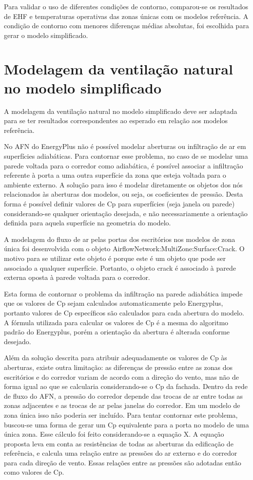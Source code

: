 \documentclass[brazil,hardcopy,openany,a5paper]{ufscthesis}
\begin{document}
	Para validar o uso de diferentes condições de contorno, comparou-se os resultados de EHF e temperaturas operativas das zonas únicas com os modelos referência. A condição de contorno com menores diferenças médias absolutas, foi escolhida para gerar o modelo simplificado.
	
	\section{Modelagem da ventilação natural no modelo simplificado}
	
	A modelagem da ventilação natural no modelo simplificado deve ser adaptada para se ter resultados correspondentes ao esperado em relação aos modelos referência.
	
	No AFN do EnergyPlus não é possível modelar aberturas ou infiltração de ar em superfícies adiabáticas. Para contornar esse problema, no caso de se modelar uma parede voltada para o corredor como adiabática, é possível associar a infiltração referente à porta a uma outra superfície da zona que esteja voltada para o ambiente externo. A solução para isso é modelar diretamente os objetos dos nós relacionados às aberturas dos modelos, ou seja, os coeficientes de pressão. Desta forma é possível definir valores de Cp para superfícies (seja janela ou parede) considerando-se qualquer orientação desejada, e não necessariamente a orientação definida para aquela superfície na geometria do modelo.
	
	A modelagem do fluxo de ar pelas portas dos escritórios nos modelos de zona única foi desenvolvida com o objeto AirflowNetwork:MultiZone:Surface:Crack. O motivo para se utilizar este objeto é porque este é um objeto que pode ser associado a qualquer superfície. Portanto, o objeto crack é associado à parede externa oposta à parede voltada para o corredor.
	
	Esta forma de contornar o problema da infiltração na parede adiabática impede que os valores de Cp sejam calculados automaticamente pelo Energyplus, portanto valores de Cp específicos são calculados para cada abertura do modelo. A fórmula utilizada para calcular os valores de Cp é a mesma do algoritmo padrão do Energyplus, porém a orientação da abertura é alterada conforme desejado.
	
	Além da solução descrita para atribuir adequadamente os valores de Cp às aberturas, existe outra limitação: as diferenças de pressão entre as zonas dos escritórios e do corredor variam de acordo com a direção do vento, mas não de forma igual ao que se calcularia considerando-se o Cp da fachada. Dentro da rede de fluxo do AFN, a pressão do corredor depende das trocas de ar entre todas as zonas adjacentes e as trocas de ar pelas janelas do corredor. Em um modelo de zona única isso não poderia ser incluído. Para tentar contornar este problema, buscou-se uma forma de gerar um Cp equivalente para a porta no modelo de uma única zona. Esse cálculo foi feito considerando-se a equação X. A equação proposta leva em conta as resistências de todas as aberturas da edificação de referência, e calcula uma relação entre as pressões do ar externo e do corredor para cada direção de vento. Essas relações entre as pressões são adotadas então como valores de Cp.
	
\end{document}
